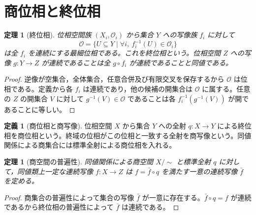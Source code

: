 \documentclass[a5paper,10pt,dvipdfmx]{jsarticle}
\theoremstyle{definition}
\newtheorem{defn}[ruledef]{定義}
\theoremstyle{plain}
\newtheorem{thm}[ruledef]{定理}
\begin{document}
\section{商位相と終位相}
\begin{thm}[終位相]\label{k258}
位相空間族 $(X_i,\mathcal O_i)$ から集合 $Y$ への写像族 $f_i$ に対して
\[
 \mathcal O=\{U\subseteq Y\mid \forall i,\ f_i^{-1}(U)\in\mathcal O_i\}
\]
は全 $f_i$ を連続にする最細位相である。これを終位相という。位相空間 $Z$ への写像 $g\colon Y\to Z$ が連続であることは全 $g\circ f_i$ が連続であることと同値である。
\end{thm}
\begin{proof}
逆像が空集合，全体集合，任意合併及び有限交叉を保存するから $\mathcal O$ は位相である。定義から各 $f_i$ は連続であり，他の候補の開集合は $\mathcal O$ に属する。任意の $Z$ の開集合 $V$ に対して $g^{-1}(V)\in\mathcal O$ であることは各 $f_i^{-1}(g^{-1}(V))$ が開であることに等しい。
\end{proof}
\begin{defn}[商位相と商写像]\label{k259}
位相空間 $X$ から集合 $Y$ への全射 $q\colon X\to Y$ による終位相を商位相という。終域の位相がこの位相と一致する全射を商写像という。同値関係による商集合には標準全射による商位相を入れる。
\end{defn}
\begin{thm}[商空間の普遍性]\label{k260}
同値関係による商空間 $X/{\sim}$ と標準全射 $q$ に対して，同値類上一定な連続写像 $f\colon X\to Z$ は $f=\bar f\circ q$ を満たす一意の連続写像 $\bar f$ を定める。
\end{thm}
\begin{proof}
商集合の普遍性によって集合の写像 $\bar f$ が一意に存在する。$\bar f\circ q=f$ が連続であるから終位相の普遍性によって $\bar f$ は連続である。
\end{proof}
\end{document}
